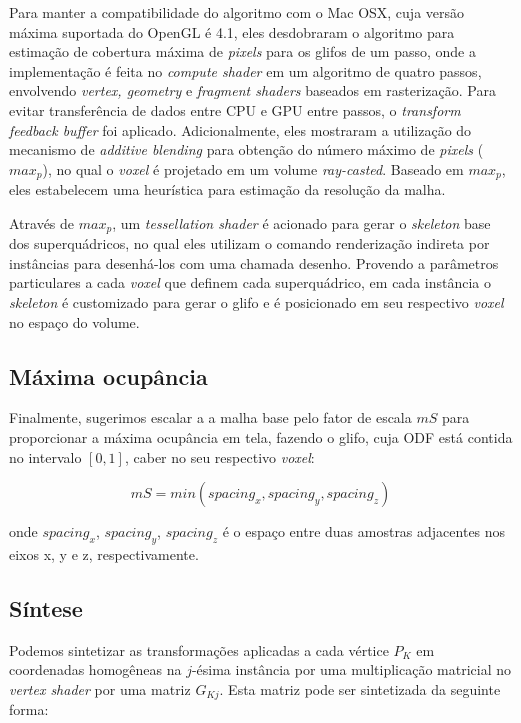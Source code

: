 Para manter a compatibilidade do algoritmo com o Mac OSX, cuja versão máxima suportada do OpenGL é 4.1, eles desdobraram o algoritmo para estimação de cobertura máxima de \textit{pixels} para os glifos de um passo, onde a implementação é feita no \textit{compute shader} em um algoritmo de quatro passos, envolvendo \textit{vertex, geometry} e \textit{fragment shaders} baseados em rasterização. Para evitar transferência de dados entre CPU e GPU entre passos, o \textit{transform feedback buffer} foi aplicado. Adicionalmente, eles mostraram a utilização do mecanismo de \textit{additive blending} para obtenção do número máximo de \textit{pixels} ($max_p$), no qual o \textit{voxel} é projetado em um volume \textit{ray-casted}. Baseado em $max_p$, eles estabelecem uma heurística para estimação da resolução da malha.

Através de $max_p$, um \textit{tessellation shader} é acionado para gerar o \textit{skeleton} base dos superquádricos, no qual eles utilizam o comando renderização indireta por instâncias para desenhá-los com uma chamada desenho. Provendo a parâmetros particulares a cada \textit{voxel} que definem cada superquádrico, em cada instância o \textit{skeleton} é customizado para gerar o glifo e é posicionado em seu respectivo \textit{voxel} no espaço do volume.

\subsection{Máxima ocupância}

Finalmente, sugerimos escalar a a malha base pelo fator de escala $mS$ para proporcionar a máxima ocupância em tela, fazendo o glifo, cuja ODF está contida no intervalo $[0, 1]$, caber no seu respectivo \textit{voxel}:

\begin{equation}
\label{eq:spacings}
mS = min(spacing_x, spacing_y, spacing_z)
\end{equation}


onde $spacing_x$, $spacing_y$, $spacing_z$ é o espaço entre duas amostras adjacentes nos eixos x, y e z, respectivamente.


\subsection{Síntese}

Podemos sintetizar as transformações aplicadas a cada vértice $P_K$ em coordenadas homogêneas na $j$-ésima instância por uma multiplicação matricial no \textit{vertex shader} por uma matriz $G_{Kj}$. Esta matriz pode ser sintetizada da seguinte forma:

